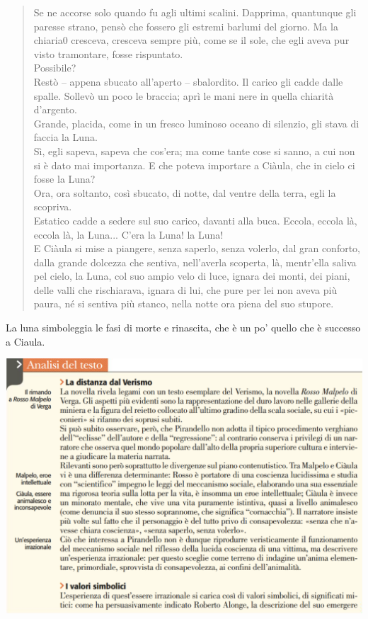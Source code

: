 \documentclass[a4paper, twoside, titlepage]{book}
\begin{document}
\begin{quotation}
Se ne accorse solo quando fu agli ultimi scalini. Dapprima, quantunque gli paresse strano, pensò che fossero gli estremi barlumi del giorno. Ma la chiaria0 cresceva, cresceva sempre più, come se il sole, che egli aveva pur visto tramontare, fosse rispuntato.\\
Possibile?\\
Restò – appena sbucato all’aperto – sbalordito. Il carico gli cadde dalle spalle. Sollevò un poco le braccia; aprì le mani nere in quella chiarità d’argento.\\
Grande, placida, come in un fresco luminoso oceano di silenzio, gli stava di faccia la Luna.\\
Sì, egli sapeva, sapeva che cos’era; ma come tante cose si sanno, a cui non si è dato mai importanza. E che poteva importare a Ciàula, che in cielo ci fosse la Luna?\\
Ora, ora soltanto, così sbucato, di notte, dal ventre della terra, egli la scopriva.\\
Estatico cadde a sedere sul suo carico, davanti alla buca. Eccola, eccola là, eccola là, la Luna... C’era la Luna! la Luna!\\
E Ciàula si mise a piangere, senza saperlo, senza volerlo, dal gran conforto, dalla grande dolcezza che sentiva, nell’averla scoperta, là, mentr’ella saliva pel cielo, la Luna, col suo ampio velo di luce, ignara dei monti, dei piani, delle valli che rischiarava, ignara di lui, che pure per lei non aveva più paura, né si sentiva più stanco, nella notte ora piena del suo stupore.\\
\end{quotation}

La luna simboleggia le fasi di morte e rinascita, che è un po' quello che è successo a Ciaula.

\begin{center}
\includegraphics[width=\textwidth]{ciaula1}
\end{center}
\end{document}
